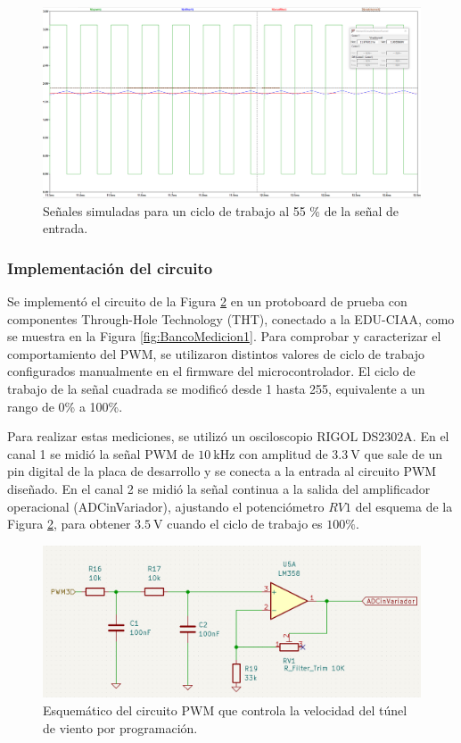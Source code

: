 \begin{figure}[H]
    \centering
    \includegraphics[width=1.1\linewidth]{Figuras/datalogger/Hardware/pwm55Percent.png}
    \caption{Señales simuladas para un ciclo de trabajo al 55 \% de la señal de entrada.}
    \label{fig:pwm55Percent}
\end{figure}


\subsubsection{Implementación del circuito}

Se implementó el circuito de la Figura \ref{fig:esquemPWM} en un protoboard de prueba con componentes Through-Hole Technology (THT), conectado a la EDU-CIAA, como se muestra en la Figura \ref{fig:BancoMedicion1}. Para comprobar y caracterizar el comportamiento del PWM, se utilizaron distintos valores de ciclo de trabajo configurados manualmente en el firmware del microcontrolador. El ciclo de trabajo de la señal cuadrada se modificó desde 1 hasta 255, equivalente a un rango de 0\% a 100\%.

Para realizar estas mediciones, se utilizó un osciloscopio RIGOL DS2302A. En el canal 1 se midió la señal PWM de $\SI{10}{\kilo\hertz}$ con amplitud de $\SI{3.3}{\volt}$ que sale de un pin digital de la placa de desarrollo y se conecta a la entrada al circuito PWM diseñado. En el canal 2 se midió la señal continua a la salida del amplificador operacional (ADCinVariador), ajustando el potenciómetro $RV1$ del esquema de la Figura \ref{fig:esquemPWM}, para obtener $\SI{3.5}{\volt}$ cuando el ciclo de trabajo es $100\%$.

\begin{figure}[H]
    \centering
    \includegraphics[width=1.1\linewidth]{Figuras/datalogger/Hardware/esquemPWM.png}
    \caption{Esquemático del circuito PWM que controla la velocidad del túnel de viento por programación.}
    \label{fig:esquemPWM}
\end{figure}

